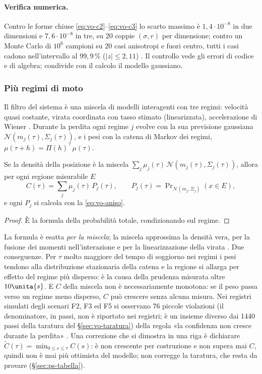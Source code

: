 \paragraph{Verifica numerica.} Contro le forme chiuse \eqref{eq:vo-c2}--\eqref{eq:vo-c3} lo scarto massimo è $1{,}4\cdot10^{-8}$ in due dimensioni e $7{,}6\cdot10^{-8}$ in tre, su 20 coppie $(\sigma,r)$ per dimensione; contro un Monte Carlo di $10^6$ campioni su 20 casi anisotropi e fuori centro, tutti i casi cadono nell'intervallo al $99{,}9\,\%$ ($|z|\le2{,}11$) . Il controllo vede gli errori di codice e di algebra; condivide con il calcolo il modello gaussiano.

\subsubsection{Più regimi di moto}\label{sec:vo-c-imm}

Il filtro del sistema è una miscela di modelli interagenti \cite{blom1988,mazor1998,barshalom2001} con tre regimi: velocità quasi costante, virata coordinata con tasso stimato (linearizzata), accelerazione di Wiener \cite{li2003}. Durante la perdita ogni regime $j$ evolve con la sua previsione gaussiana $\mathcal N(m_j(\tau),\Sigma_j(\tau))$, e i pesi con la catena di Markov dei regimi, $\mu(\tau+h)=\Pi(h)^\top\mu(\tau)$.

\begin{proposizione}\label{prop:vo-imm}
Se la densità della posizione è la miscela $\sum_j\mu_j(\tau)\,\mathcal N(m_j(\tau),\Sigma_j(\tau))$, allora per ogni regione misurabile $E$
\[C(\tau)=\sum_j\mu_j(\tau)\,P_j(\tau),\qquad P_j(\tau)=\Pr\nolimits_{\mathcal N(m_j,\Sigma_j)}(x\in E),\]
e ogni $P_j$ si calcola con la \eqref{eq:vo-aniso}.
\end{proposizione}
\begin{proof}
È la formula della probabilità totale, condizionando sul regime.
\end{proof}
La formula è esatta \emph{per la miscela}; la miscela approssima la densità vera, per la fusione dei momenti nell'interazione e per la linearizzazione della virata . Due conseguenze. Per $\tau$ molto maggiore del tempo di soggiorno nei regimi i pesi tendono alla distribuzione stazionaria della catena e la regione si allarga per effetto del regime più disperso: è la causa della prudenza misurata oltre $10\unita{s}$. E $C$ della miscela non è necessariamente monotona: se il peso passa verso un regime meno disperso, $C$ può crescere senza alcuna misura. Nei registri simulati degli scenari F2, F3 ed F5 si osservano 76 piccole violazioni (il denominatore, in passi, non è riportato nei registri; è un insieme diverso dai 1440 passi della taratura del \S\ref{sec:vo-taratura}) della regola «la confidenza non cresce durante la perdita» . Una correzione che si dimostra in una riga è dichiarare $\tilde C(\tau)=\min_{0\le s\le\tau}C(s)$: è non crescente per costruzione e non supera mai $C$, quindi non è mai più ottimista del modello; non corregge la taratura, che resta da provare (\S\ref{sec:ps-tabella}).

